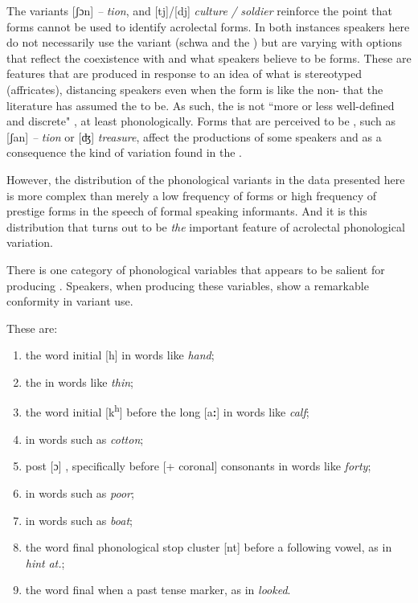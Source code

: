    The variants [ʃɔn] \textit{–} \textit{tion}, and [tj]\slash [dj] \textit{culture} \textit{/} \textit{soldier} reinforce the point that  forms cannot be used to identify acrolectal forms.  In both instances speakers here do not necessarily use the  variant (schwa and the ) but are varying with options that reflect the coexistence with  and what speakers believe to be  forms.  These are features that are produced in response to an idea of what is stereotyped  (affricates), distancing speakers even when the  form is like the non- that the literature has assumed the  to be.  As such, the  is not ``more or less well-defined and discrete" \citep[241]{Winford1997}, at least phonologically.  Forms that are perceived to be , such as [ʃan] \textit{–} \textit{tion} or [ʤ] \textit{treasure}, affect the productions of some speakers and as a consequence the kind of variation found in the .  

However, the distribution of the phonological variants in the data presented here is more complex than merely a low frequency of  forms or high frequency of prestige forms in the speech of formal  speaking informants.  And it is this distribution that turns out to be \textit{the} important feature of acrolectal phonological variation.   

There is one category of phonological variables that appears to be salient for producing .  Speakers, when producing these variables, show a remarkable conformity in variant use.  

These are: 

\begin{enumerate}[label=\alph*)]
\item the word initial  [h] in words like \textit{hand};
\item the  in words like \textit{thin}; 
\item the word initial  [k\textsuperscript{h}] before the long  [a\textbf{:}] in words like \textit{calf};
\item\relax [ɔ] in words such as \textit{cotton};
\item post [ɔ] , specifically before [+ coronal] consonants in words like \textit{forty};
\item\relax [ɔr] in words such as \textit{poor};
\item\relax [o] in words such as \textit{boat};
\item the word final phonological stop cluster [nt] before a following vowel, as in \textit{hint} \textit{at.};
\item the word final  when a past tense marker, as in \textit{looked}.
\end{enumerate}

